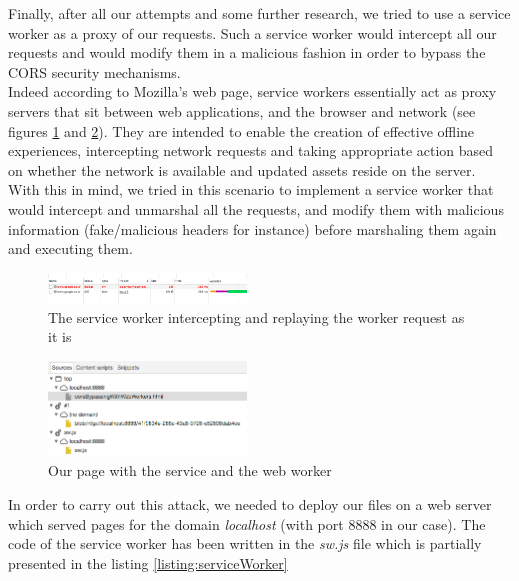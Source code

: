 \documentclass[journal]{IEEEtran}
\begin{document}
Finally, after all our attempts and some further research, we tried to use a service worker as a proxy of our requests. Such a service worker would intercept all our requests and would modify them in a malicious fashion in order to bypass the CORS security mechanisms. \\
Indeed according to Mozilla's web page, service workers essentially act as proxy servers that sit between web applications, and the browser and network (see figures \ref{fig:corsWithServiceWorkers} and \ref{fig:serviceAndWebWorker}). They are intended to enable the creation of effective offline experiences, intercepting network requests and taking appropriate action based on whether the network is available and updated assets reside on the server. \\
With this in mind, we tried in this scenario to implement a service worker that would intercept and unmarshal all the requests, and modify them with malicious information (fake/malicious headers for instance) before marshaling them again and executing them.

\begin{figure}[h]
\centering
\includegraphics[width=0.47\textwidth]{images/corsWithServiceWorkers.png}
\caption{The service worker intercepting and replaying the worker request as it is}
\label{fig:corsWithServiceWorkers}
\end{figure}

\begin{figure}[h]
\centering
\includegraphics[width=0.47\textwidth]{images/serviceAndWebWorker.png}
\caption{Our page with the service and the web worker}
\label{fig:serviceAndWebWorker}
\end{figure}

In order to carry out this attack, we needed to deploy our files on a web server which served pages for the domain \emph{localhost} (with port 8888 in our case). The code of the service worker has been written in the \emph{sw.js} file which is partially presented in the listing \ref{listing:serviceWorker}
\end{document}
